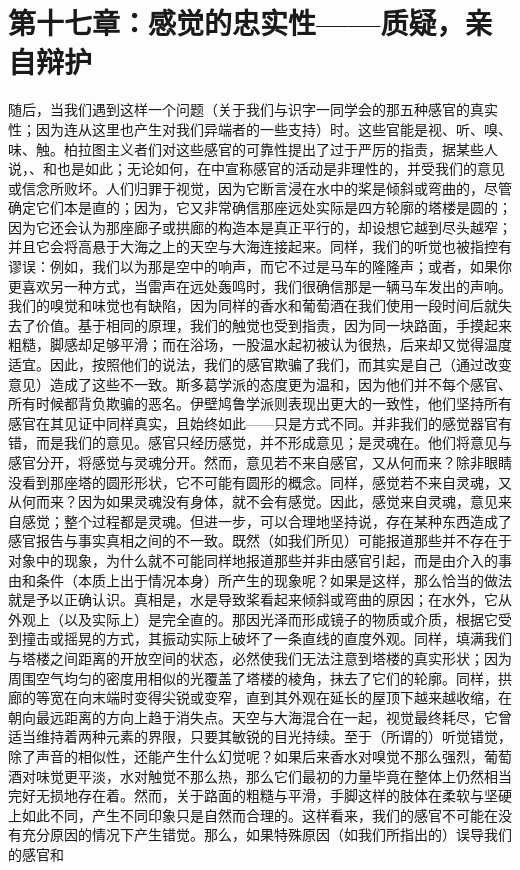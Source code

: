 
\section{第十七章：感觉的忠实性——质疑，亲自辩护}

随后，当我们遇到这样一个问题（关于我们与识字一同学会的那五种感官的真实性；因为连从这里也产生对我们异端者的一些支持）时。这些官能是视、听、嗅、味、触。柏拉图主义者们对这些感官的可靠性提出了过于严厉的指责，据某些人说，、和也是如此；无论如何，在中宣称感官的活动是非理性的，并受我们的意见或信念所败坏。人们归罪于视觉，因为它断言浸在水中的桨是倾斜或弯曲的，尽管确定它们本是直的；因为，它又非常确信那座远处实际是四方轮廓的塔楼是圆的；因为它还会认为那座廊子或拱廊的构造本是真正平行的，却设想它越到尽头越窄；并且它会将高悬于大海之上的天空与大海连接起来。同样，我们的听觉也被指控有谬误：例如，我们以为那是空中的响声，而它不过是马车的隆隆声；或者，如果你更喜欢另一种方式，当雷声在远处轰鸣时，我们很确信那是一辆马车发出的声响。我们的嗅觉和味觉也有缺陷，因为同样的香水和葡萄酒在我们使用一段时间后就失去了价值。基于相同的原理，我们的触觉也受到指责，因为同一块路面，手摸起来粗糙，脚感却足够平滑；而在浴场，一股温水起初被认为很热，后来却又觉得温度适宜。因此，按照他们的说法，我们的感官欺骗了我们，而其实是自己（通过改变意见）造成了这些不一致。斯多葛学派的态度更为温和，因为他们并不每个感官、所有时候都背负欺骗的恶名。伊壁鸠鲁学派则表现出更大的一致性，他们坚持所有感官在其见证中同样真实，且始终如此——只是方式不同。并非我们的感觉器官有错，而是我们的意见。感官只经历感觉，并不形成意见；是灵魂在。他们将意见与感官分开，将感觉与灵魂分开。然而，意见若不来自感官，又从何而来？除非眼睛没看到那座塔的圆形形状，它不可能有圆形的概念。同样，感觉若不来自灵魂，又从何而来？因为如果灵魂没有身体，就不会有感觉。因此，感觉来自灵魂，意见来自感觉；整个过程都是灵魂。但进一步，可以合理地坚持说，存在某种东西造成了感官报告与事实真相之间的不一致。既然（如我们所见）可能报道那些并不存在于对象中的现象，为什么就不可能同样地报道那些并非由感官引起，而是由介入的事由和条件（本质上出于情况本身）所产生的现象呢？如果是这样，那么恰当的做法就是予以正确认识。真相是，水是导致桨看起来倾斜或弯曲的原因；在水外，它从外观上（以及实际上）是完全直的。那因光泽而形成镜子的物质或介质，根据它受到撞击或摇晃的方式，其振动实际上破坏了一条直线的直度外观。同样，填满我们与塔楼之间距离的开放空间的状态，必然使我们无法注意到塔楼的真实形状；因为周围空气均匀的密度用相似的光覆盖了塔楼的棱角，抹去了它们的轮廓。同样，拱廊的等宽在向末端时变得尖锐或变窄，直到其外观在延长的屋顶下越来越收缩，在朝向最远距离的方向上趋于消失点。天空与大海混合在一起，视觉最终耗尽，它曾适当维持着两种元素的界限，只要其敏锐的目光持续。至于（所谓的）听觉错觉，除了声音的相似性，还能产生什么幻觉呢？如果后来香水对嗅觉不那么强烈，葡萄酒对味觉更平淡，水对触觉不那么热，那么它们最初的力量毕竟在整体上仍然相当完好无损地存在着。然而，关于路面的粗糙与平滑，手脚这样的肢体在柔软与坚硬上如此不同，产生不同印象只是自然而合理的。这样看来，我们的感官不可能在没有充分原因的情况下产生错觉。那么，如果特殊原因（如我们所指出的）误导我们的感官和